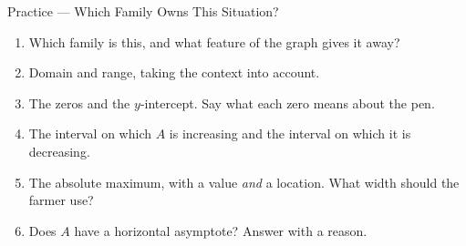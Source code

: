 \documentclass[10pt]{article}
\begin{document}
\begin{notesbox}{Practice --- Which Family Owns This Situation?}
\begin{enumerate}[leftmargin=1.6em, itemsep=6pt, topsep=4pt]
\begin{enumerate}[label=(\alph*), leftmargin=1.6em, itemsep=3pt, topsep=3pt]
  \item Which family is this, and what feature of the graph gives it away?
  \item Domain and range, taking the context into account.
  \item The zeros and the $y$-intercept. Say what each zero means about the pen.
  \item The interval on which $A$ is increasing and the interval on which it is decreasing.
  \item The absolute maximum, with a value \emph{and} a location. What width should the farmer use?
  \item Does $A$ have a horizontal asymptote? Answer with a reason.
\end{enumerate}


\end{enumerate}
\end{notesbox}

\vspace{0.10in}
\end{document}
